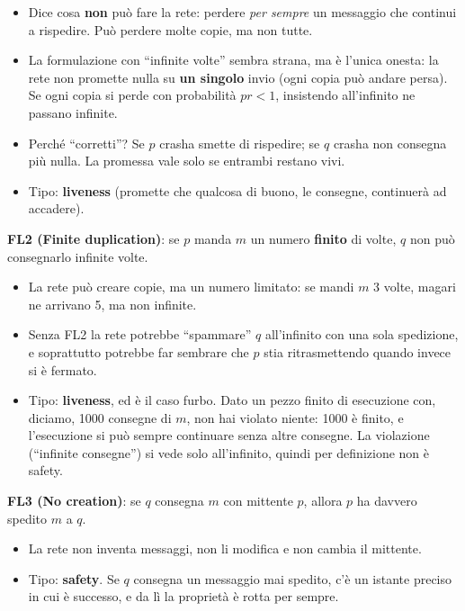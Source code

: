 \begin{itemize}
\tightlist
\item
  Dice cosa \textbf{non} può fare la rete: perdere \emph{per sempre} un messaggio che continui a rispedire. Può perdere molte copie, ma non tutte.
\item
  La formulazione con ``infinite volte'' sembra strana, ma è l'unica onesta: la rete non promette nulla su \textbf{un singolo} invio (ogni copia può andare persa). Se ogni copia si perde con probabilità \(pr < 1\), insistendo all'infinito ne passano infinite.
\item
  Perché ``corretti''? Se \(p\) crasha smette di rispedire; se \(q\) crasha non consegna più nulla. La promessa vale solo se entrambi restano vivi.
\item
  Tipo: \textbf{liveness} (promette che qualcosa di buono, le consegne, continuerà ad accadere).
\end{itemize}

\textbf{FL2 (Finite duplication)}: se \(p\) manda \(m\) un numero \textbf{finito} di volte, \(q\) non può consegnarlo infinite volte.

\begin{itemize}
\tightlist
\item
  La rete può creare copie, ma un numero limitato: se mandi \(m\) 3 volte, magari ne arrivano 5, ma non infinite.
\item
  Senza FL2 la rete potrebbe ``spammare'' \(q\) all'infinito con una sola spedizione, e soprattutto potrebbe far sembrare che \(p\) stia ritrasmettendo quando invece si è fermato.
\item
  Tipo: \textbf{liveness}, ed è il caso furbo. Dato un pezzo finito di esecuzione con, diciamo, 1000 consegne di \(m\), non hai violato niente: 1000 è finito, e l'esecuzione si può sempre continuare senza altre consegne. La violazione (``infinite consegne'') si vede solo all'infinito, quindi per definizione non è safety.
\end{itemize}

\textbf{FL3 (No creation)}: se \(q\) consegna \(m\) con mittente \(p\), allora \(p\) ha davvero spedito \(m\) a \(q\).

\begin{itemize}
\tightlist
\item
  La rete non inventa messaggi, non li modifica e non cambia il mittente.
\item
  Tipo: \textbf{safety}. Se \(q\) consegna un messaggio mai spedito, c'è un istante preciso in cui è successo, e da lì la proprietà è rotta per sempre.
\end{itemize}

